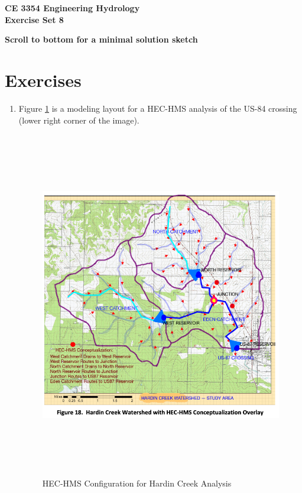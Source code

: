 \documentclass[12pt]{article}
\begin{document}
\begin{center}
{\textbf{{ CE 3354 Engineering Hydrology} \\ {Exercise Set 8}}}
\end{center}

\textbf{Scroll to bottom for a minimal solution sketch}

\section*{\small{Exercises}}
\begin{enumerate}

\item Figure \ref{fig:HardinCreekLayout} is a modeling layout for a HEC-HMS analysis of the US-84 crossing (lower right corner of the image).

\begin{figure}[h!] %
   \centering
   \includegraphics[height=6in]{HardinCreekLayout.png} 
   \caption{HEC-HMS Configuration for Hardin Creek Analysis}
   \label{fig:HardinCreekLayout}
\end{figure}


\end{enumerate}
\end{document}
